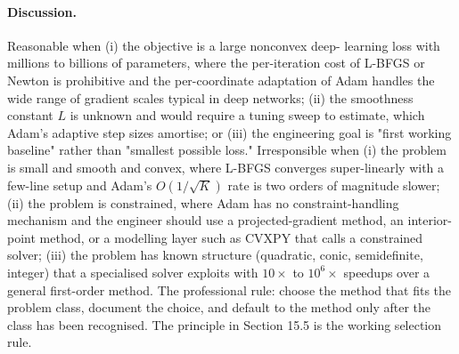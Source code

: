 \paragraph{Discussion.}
Reasonable when (i) the objective is a large nonconvex deep-
learning loss with millions to billions of parameters, where the
per-iteration cost of L-BFGS or Newton is prohibitive and the
per-coordinate adaptation of Adam handles the wide range of
gradient scales typical in deep networks; (ii) the smoothness
constant $L$ is unknown and would require a tuning sweep to
estimate, which Adam's adaptive step sizes amortise; or (iii)
the engineering goal is "first working baseline" rather than
"smallest possible loss." Irresponsible when (i) the problem is
small and smooth and convex, where L-BFGS converges
super-linearly with a few-line setup and Adam's $O(1/\sqrt{K})$
rate is two orders of magnitude slower; (ii) the problem is
constrained, where Adam has no constraint-handling mechanism and
the engineer should use a projected-gradient method, an interior-
point method, or a modelling layer such as CVXPY that calls a
constrained solver; (iii) the problem has known structure
(quadratic, conic, semidefinite, integer) that a specialised
solver exploits with $10\times$ to $10^{6}\times$ speedups over a
general first-order method. The professional rule: choose the
method that fits the problem class, document the choice, and
default to the method only after the class has been recognised.
The principle in Section 15.5 is the working selection rule.

